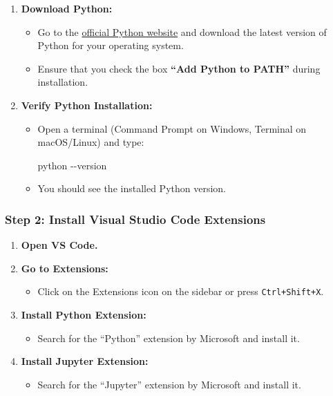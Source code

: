 \documentclass[
  letterpaper,
  DIV=11,
  numbers=noendperiod]{scrreprt}
\newenvironment{Shaded}{\begin{snugshade}}{\end{snugshade}}
\newcommand{\AttributeTok}[1]{\textcolor[rgb]{0.40,0.45,0.13}{#1}}
\newcommand{\ExtensionTok}[1]{\textcolor[rgb]{0.00,0.23,0.31}{#1}}
\providecommand{\tightlist}{%
  \setlength{\itemsep}{0pt}\setlength{\parskip}{0pt}}\usepackage{longtable,booktabs,array}
\begin{document}
\begin{enumerate}
\def\labelenumi{\arabic{enumi}.}
\tightlist
\item
  \textbf{Download Python:}

  \begin{itemize}
  \tightlist
  \item
    Go to the \href{https://www.python.org/downloads/}{official Python
    website} and download the latest version of Python for your
    operating system.
  \item
    Ensure that you check the box \textbf{``Add Python to PATH''} during
    installation.
  \end{itemize}
\item
  \textbf{Verify Python Installation:}

  \begin{itemize}
  \item
    Open a terminal (Command Prompt on Windows, Terminal on macOS/Linux)
    and type:

\begin{Shaded}
\begin{Highlighting}[]
\ExtensionTok{python} \AttributeTok{{-}{-}version}
\end{Highlighting}
\end{Shaded}
  \item
    You should see the installed Python version.
  \end{itemize}
\end{enumerate}

\hypertarget{step-2-install-visual-studio-code-extensions}{%
\subsubsection{Step 2: Install Visual Studio Code
Extensions}\label{step-2-install-visual-studio-code-extensions}}

\begin{enumerate}
\def\labelenumi{\arabic{enumi}.}
\tightlist
\item
  \textbf{Open VS Code.}
\item
  \textbf{Go to Extensions:}

  \begin{itemize}
  \tightlist
  \item
    Click on the Extensions icon on the sidebar or press
    \texttt{Ctrl+Shift+X}.
  \end{itemize}
\item
  \textbf{Install Python Extension:}

  \begin{itemize}
  \tightlist
  \item
    Search for the ``Python'' extension by Microsoft and install it.
  \end{itemize}
\item
  \textbf{Install Jupyter Extension:}

  \begin{itemize}
  \tightlist
  \item
    Search for the ``Jupyter'' extension by Microsoft and install it.
  \end{itemize}
\end{enumerate}
\end{document}
